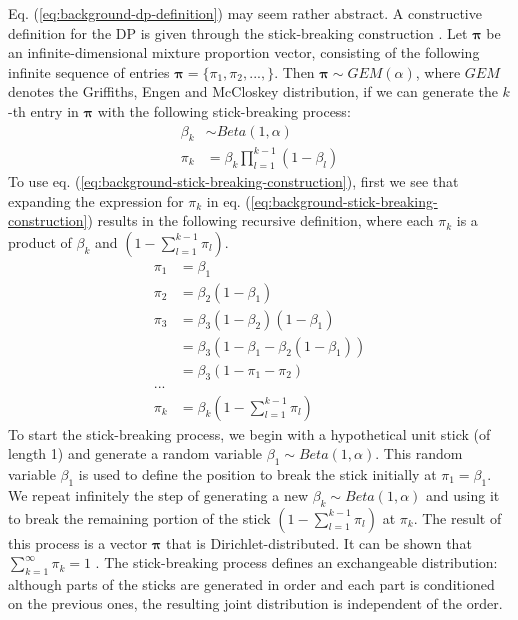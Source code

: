 Eq. (\ref{eq:background-dp-definition}) may seem rather abstract. A constructive definition for the DP is given through the stick-breaking construction \cite{ishwaran2011gibbs}. Let $\boldsymbol{\pi}$ be an infinite-dimensional mixture proportion vector, consisting of the following infinite sequence of entries $\boldsymbol{\pi}=\{\pi_1, \pi_2, ..., \}$. Then $\boldsymbol{\pi} \sim GEM(\alpha)$, where $GEM$ denotes the Griffiths, Engen and McCloskey distribution, if we can generate the $k$-th entry in $\boldsymbol{\pi}$ with the following stick-breaking process:
\begin{equation}
\begin{aligned}
\beta_k &\sim Beta(1, \alpha) \\
\pi_k     &= \beta_k \prod_{l=1}^{k-1} (1-\beta_l) 
\end{aligned}
\label{eq:background-stick-breaking-construction}
\end{equation}
To use eq. (\ref{eq:background-stick-breaking-construction}), first we see that expanding the expression for $\pi_k$ in eq. (\ref{eq:background-stick-breaking-construction}) results in the following recursive definition, where each $\pi_k$ is a product of $\beta_k$ and $(1-\sum_{l=1}^{k-1} \pi_l)$.
\begin{equation}
\begin{aligned}
\pi_1 &= \beta_1 \\
\pi_2 &= \beta_2(1-\beta_1) \\
\pi_3 &= \beta_3(1-\beta_2)(1-\beta_1) \\
         &= \beta_3(1-\beta_1-\beta_2(1-\beta_1)) \\
         &= \beta_3(1-\pi_1-\pi_2) \\
... \\
\pi_k &= \beta_k(1-\sum_{l=1}^{k-1} \pi_l)
\end{aligned}
\label{eq:background-pi-gem}
\end{equation}
To start the stick-breaking process, we begin with a hypothetical unit stick (of length 1) and generate a random variable $\beta_1 \sim Beta(1, \alpha)$. This random variable $\beta_1$ is used to define the position to break the stick initially at $\pi_1 = \beta_1$. We repeat infinitely the step of generating a new $\beta_k \sim Beta(1, \alpha)$ and using it to break the remaining portion of the stick $(1-\sum_{l=1}^{k-1} \pi_l)$ at $\pi_k$. The result of this process is a vector $\boldsymbol{\pi}$ that is Dirichlet-distributed. It can be shown that $\sum_{k=1}^{\infty} \pi_k=1$ \cite{ishwaran2011gibbs}. The stick-breaking process defines an exchangeable distribution: although parts of the sticks are generated in order and each part is conditioned on the previous ones, the resulting joint distribution is independent of the order.

